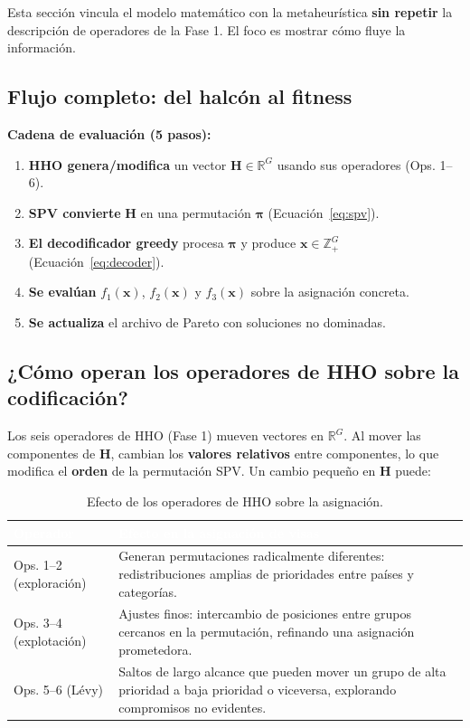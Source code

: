 \documentclass[12pt,letterpaper]{article}
\begin{document}
Esta sección vincula el modelo matemático con la metaheurística \textbf{sin repetir} la descripción de operadores de la Fase 1. El foco es mostrar cómo fluye la información.

\subsection{Flujo completo: del halcón al fitness}

\begin{notebox}
\textbf{Cadena de evaluación (5 pasos):}

\begin{enumerate}
    \item \textbf{HHO genera/modifica} un vector $\mathbf{H} \in \mathbb{R}^G$ usando sus operadores (Ops. 1--6).
    \item \textbf{SPV convierte} $\mathbf{H}$ en una permutación $\boldsymbol{\pi}$ (Ecuación~\ref{eq:spv}).
    \item \textbf{El decodificador greedy} procesa $\boldsymbol{\pi}$ y produce $\mathbf{x} \in \mathbb{Z}^G_{+}$ (Ecuación~\ref{eq:decoder}).
    \item \textbf{Se evalúan} $f_1(\mathbf{x})$, $f_2(\mathbf{x})$ y $f_3(\mathbf{x})$ sobre la asignación concreta.
    \item \textbf{Se actualiza} el archivo de Pareto con soluciones no dominadas.
\end{enumerate}
\end{notebox}

\subsection{¿Cómo operan los operadores de HHO sobre la codificación?}

Los seis operadores de HHO (Fase 1) mueven vectores en $\mathbb{R}^G$. Al mover las componentes de $\mathbf{H}$, cambian los \textbf{valores relativos} entre componentes, lo que modifica el \textbf{orden} de la permutación SPV. Un cambio pequeño en $\mathbf{H}$ puede:

\begin{table}[H]
\centering
\caption{Efecto de los operadores de HHO sobre la asignación.}
\label{tab:efecto_ops}
\renewcommand{\arraystretch}{1.4}
\begin{tabular}{lp{9cm}}
\toprule
\rowcolor{tablehead}
\textcolor{white}{\textbf{Operador}} & \textcolor{white}{\textbf{Efecto en la asignación de visas}} \\
\midrule
Ops. 1--2 (exploración) & Generan permutaciones radicalmente diferentes: redistribuciones amplias de prioridades entre países y categorías. \\
\rowcolor{gray!8}
Ops. 3--4 (explotación) & Ajustes finos: intercambio de posiciones entre grupos cercanos en la permutación, refinando una asignación prometedora. \\
Ops. 5--6 (Lévy) & Saltos de largo alcance que pueden mover un grupo de alta prioridad a baja prioridad o viceversa, explorando compromisos no evidentes. \\
\bottomrule
\end{tabular}
\end{table}
\end{document}
